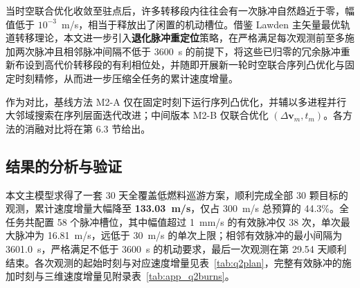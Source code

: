 当时空联合优化收敛至驻点后，许多转移段内往往会有一次脉冲自然趋近于零，幅值低于 $10^{-3}$~m/s，相当于释放出了闲置的机动槽位。借鉴 Lawden 主矢量最优轨道转移理论\cite{lawden1963}，本文进一步引入\textbf{退化脉冲重定位}策略，在严格满足每次观测前至多施加两次脉冲且相邻脉冲间隔不低于 3600~s 的前提下，将这些已归零的冗余脉冲重新布设到高代价转移段的有利相位处，并随即开展新一轮时空联合序列凸优化与固定时刻精修，从而进一步压缩全任务的累计速度增量。

作为对比，基线方法 M2-A 仅在固定时刻下运行序列凸优化\cite{mao2016}，并辅以多进程并行大邻域搜索\cite{shaw1998}在序列层面迭代改进；中间版本 M2-B 仅联合优化 $(\Delta\bm v_m, t_m)$。各方法的消融对比将在第 6.3 节给出。

\subsection{结果的分析与验证}

本文主模型求得了一套 30 天全覆盖低燃料巡游方案，顺利完成全部 30 颗目标的观测，累计速度增量大幅降至 \textbf{133.03~m/s}，仅占 300~m/s 总预算的 44.3\%。全任务共配置 58 个脉冲槽位，其中幅值超过 1~mm/s 的有效脉冲仅 38 次，单次最大脉冲为 16.81~m/s，远低于 30~m/s 的单次上限；相邻有效脉冲的最小间隔为 3601.0~s，严格满足不低于 3600~s 的机动要求，最后一次观测在第 29.54 天顺利结束。各次观测的起始时刻与对应速度增量见表~\ref{tab:q2plan}，完整有效脉冲的施加时刻与三维速度增量见附录表~\ref{tab:app_q2burns}。

